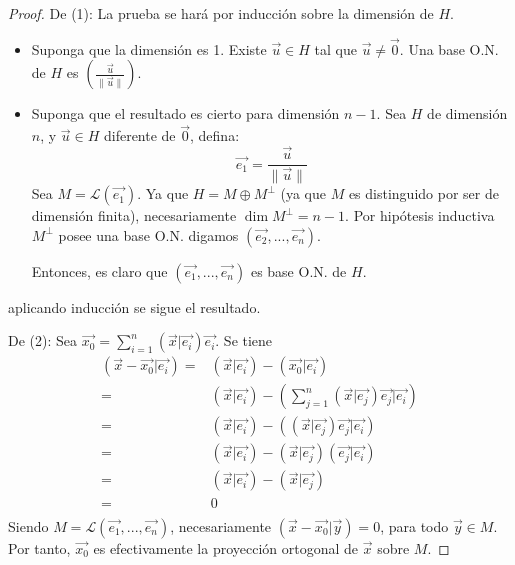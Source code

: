 \documentclass[12pt]{report}
\theoremstyle{largebreak}
\newcommand\norm[1]{\ensuremath{\|#1\|}}
\newcommand\pint[2]{\ensuremath{\left(#1\big| #2\right)}}
\begin{document}
    \begin{proof}
        De (1): La prueba se hará por inducción sobre la dimensión de $H$.
        \begin{itemize}
            \item Suponga que la dimensión es 1. Existe $\vec{u}\in H$ tal que $\vec{u}\neq\vec{0}$. Una base O.N. de $H$ es $(\frac{\vec{u}}{\norm{\vec{u}}})$.
            \item Suponga que el resultado es cierto para dimensión $n-1$. Sea $H$ de dimensión $n$, y $\vec{u}\in H$ diferente de $\vec{0}$, defina:
            \begin{equation*}
                \vec{e_1}=\frac{\vec{u}}{\norm{\vec{u}}}
            \end{equation*}
            Sea $M=\mathcal{L}(\vec{e_1})$. Ya que $H=M\oplus M^\perp$ (ya que $M$ es distinguido por ser de dimensión finita), necesariamente $\dim M^\perp = n-1$. Por hipótesis inductiva $M^\perp$ posee una base O.N. digamos $(\vec{e_2},...,\vec{e_n})$.
            
            Entonces, es claro que $(\vec{e_1},...,\vec{e_n})$ es base O.N. de $H$.
        \end{itemize}
        aplicando inducción se sigue el resultado.

        De (2): Sea $\vec{x_0}=\sum_{ i=1}^{n}\pint{\vec{x}}{\vec{e_i}}\vec{e_i}$. Se tiene
        \begin{equation*}
            \begin{split}
                \pint{\vec{x}-\vec{x_0}}{\vec{e_i}}=&\pint{\vec{x}}{\vec{e_i}}-\pint{\vec{x_0}}{\vec{e_i}} \\
                =&\pint{\vec{x}}{\vec{e_i}}-\pint{\sum_{ j=1}^{n}\pint{\vec{x}}{\vec{e_j}}\vec{e_j}}{\vec{e_i}} \\
                =&\pint{\vec{x}}{\vec{e_i}}-\pint{\pint{\vec{x}}{\vec{e_j}}\vec{e_j}}{\vec{e_i}} \\
                =&\pint{\vec{x}}{\vec{e_i}}-\pint{\vec{x}}{\vec{e_j}}\pint{\vec{e_j}}{\vec{e_i}} \\
                =&\pint{\vec{x}}{\vec{e_i}}-\pint{\vec{x}}{\vec{e_j}}\\
                =&0\\
            \end{split}
        \end{equation*}
        Siendo $M=\mathcal{L}(\vec{e_1},...,\vec{e_n})$, necesariamente $\pint{\vec{x}-\vec{x_0}}{\vec{y}}=0$, para todo $\vec{y}\in M$. Por tanto, $\vec{x_0}$ es efectivamente la proyección ortogonal de $\vec{x}$ sobre $M$.
    \end{proof}
\end{document}
